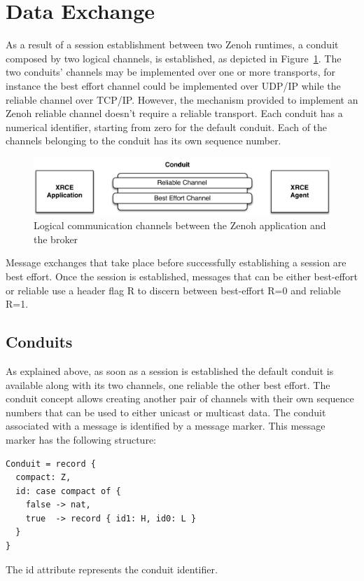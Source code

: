 \documentclass[a4paper,oneside,article]{memoir}
\begin{document}

\section{Data Exchange}

As a result of a session establishment between two Zenoh runtimes, a conduit composed by two logical
channels, is established, as depicted in Figure~\ref{fig:zenoh-conduit}.  The two conduits’ channels
may be implemented over one or more transports, for instance the best effort channel could be
implemented over UDP/IP while the reliable channel over TCP/IP\@.  However, the mechanism provided
to implement an Zenoh reliable channel doesn’t require a reliable transport.  Each conduit has a
numerical identifier, starting from zero for the default conduit.  Each of the channels belonging to
the conduit has its own sequence number.

\begin{figure}
\centering
\includegraphics[scale=0.6]{zenoh-conduit.pdf}
\caption{Logical communication channels between the Zenoh application and the broker}\label{fig:zenoh-conduit}
\end{figure}

Message exchanges that take place before successfully establishing a session are best effort.  Once
the session is established, messages that can be either best-effort or reliable use a header flag R
to discern between best-effort R=0 and reliable R=1.

\subsection{Conduits}

As explained above, as soon as a session is established the default conduit is available along with
its two channels, one reliable the other best effort.  The conduit concept allows creating another
pair of channels with their own sequence numbers that can be used to either unicast or multicast
data.  The conduit associated with a message is identified by a message marker.  This message marker
has the following structure:
\begin{verbatim}
Conduit = record {
  compact: Z,
  id: case compact of {
    false -> nat,
    true  -> record { id1: H, id0: L }
  }
}
\end{verbatim}
The id attribute represents the conduit identifier.
\end{document}
